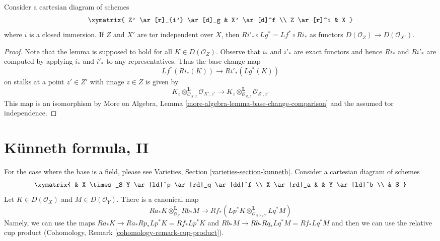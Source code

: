 \begin{lemma}
\label{lemma-compare-base-change-closed-immersion}
Consider a cartesian diagram of schemes
$$
\xymatrix{
Z' \ar[r]_{i'} \ar[d]_g & X' \ar[d]^f \\
Z \ar[r]^i & X
}
$$
where $i$ is a closed immersion. If $Z$ and $X'$ are
tor independent over $X$, then $Ri'_* \circ Lg^* = Lf^* \circ Ri_*$
as functors $D(\mathcal{O}_Z) \to D(\mathcal{O}_{X'})$.
\end{lemma}

\begin{proof}
Note that the lemma is supposed to hold for all $K \in D(\mathcal{O}_Z)$.
Observe that $i_*$ and $i'_*$ are exact functors and hence
$Ri_*$ and $Ri'_*$ are computed by applying $i_*$ and $i'_*$
to any representatives. Thus the base change map
$$
Lf^*(Ri_*(K)) \longrightarrow Ri'_*(Lg^*(K))
$$
on stalks at a point $z' \in Z'$ with image $z \in Z$ is given by
$$
K_z \otimes_{\mathcal{O}_{X, z}}^\mathbf{L} \mathcal{O}_{X', z'}
\longrightarrow
K_z \otimes_{\mathcal{O}_{Z, z}}^\mathbf{L} \mathcal{O}_{Z', z'}
$$
This map is an isomorphism by
More on Algebra, Lemma \ref{more-algebra-lemma-base-change-comparison}
and the assumed tor independence.
\end{proof}








\section{K\"unneth formula, II}
\label{section-kunneth}

\noindent
For the case where the base is a field, please see
Varieties, Section \ref{varieties-section-kunneth}.
Consider a cartesian diagram of schemes
$$
\xymatrix{
& X \times_S Y \ar[ld]^p \ar[rd]_q \ar[dd]^f \\
X \ar[rd]_a & & Y \ar[ld]^b \\
& S
}
$$
Let $K \in D(\mathcal{O}_X)$ and $M \in D(\mathcal{O}_Y)$.
There is a canonical map
\begin{equation}
\label{equation-kunneth}
Ra_*K \otimes_{\mathcal{O}_S}^\mathbf{L} Rb_*M
\longrightarrow
Rf_*(Lp^*K \otimes_{\mathcal{O}_{X \times_S Y}}^\mathbf{L} Lq^*M)
\end{equation}
Namely, we can use the maps
$Ra_*K \to Ra_*Rp_* Lp^*K = Rf_*Lp^*K$ and
$Rb_*M \to Rb_*Rq_* Lq^*M = Rf_*Lq^*M$ and then we can use the
relative cup product (Cohomology, Remark \ref{cohomology-remark-cup-product}).

